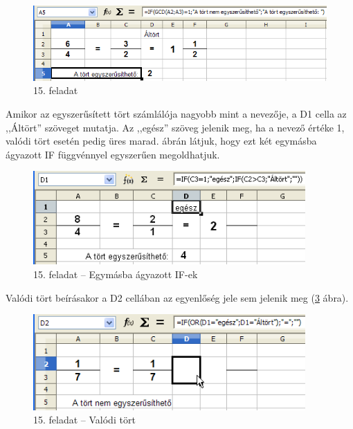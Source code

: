 \begin{figure}[!h]
\begin{center}
\includegraphics[width=13.873cm]{oocalcv1-img84.png}
\caption{15. feladat}\label{15-feladat}
\end{center}
\end{figure}

Amikor az egyszerűsített tört számlálója nagyobb mint a
nevezője, a D1 cella az ,,Áltört'' szöveget mutatja. Az
,,egész'' szöveg jelenik meg, ha a nevező értéke 1, valódi
tört esetén pedig üres marad.   ábrán
látjuk, hogy ezt két egymásba ágyazott IF
függvénnyel egyszerűen megoldhatjuk.

\begin{figure}[!h]
\begin{center}
\includegraphics[width=10.404cm]{oocalcv1-img85.png}
\caption{15. feladat -- Egymásba ágyazott IF-ek}\label{15-feladatIFek}
\end{center}
\end{figure}

Valódi tört beírásakor a D2 cellában az egyenlőség jele
sem jelenik meg (\ref{15-feladatValódi} ábra).

\begin{figure}[!h]
\begin{center}
\includegraphics[width=10.402cm]{oocalcv1-img86.png}
\caption{15. feladat -- Valódi tört}\label{15-feladatValódi}
\end{center}
\end{figure}

